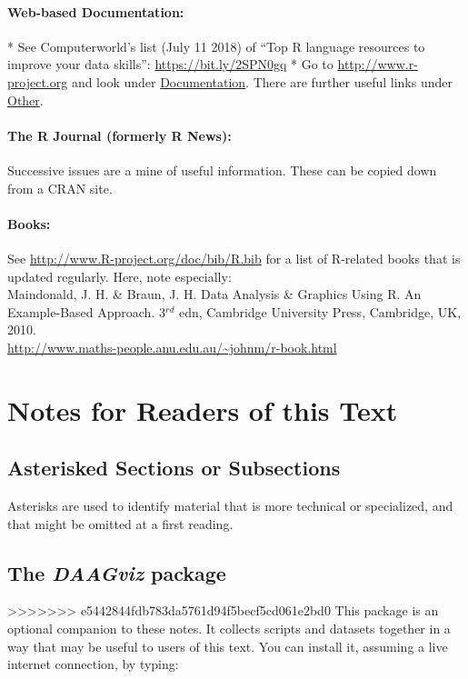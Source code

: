 \paragraph{Web-based Documentation:}

* See Computerworld's list (July 11 2018) of ``Top R language
resources to improve your data skills'':  
\url{https://bit.ly/2SPN0gq}
* Go to \url{http://www.r-project.org}
and look under \underline{Documentation}.
There are further useful links under \underline{Other}.

\paragraph{The R Journal (formerly R News):}
Successive issues are a mine of useful information.
These can be copied down from a CRAN site.

\paragraph{Books:}
See \url{http://www.R-project.org/doc/bib/R.bib} for a list of
R-related books that is updated regularly. Here, note
especially:\\[3pt]
\noindent
Maindonald, J. H. \& Braun, J. H. Data Analysis \&
  Graphics Using R. An Example-Based Approach. 3$^{rd}$ edn, Cambridge
  University Press,
  Cambridge, UK, 2010.\\
\noindent
\url{http://www.maths-people.anu.edu.au/~johnm/r-book.html}

\cleardoublepage
\section*{Notes for Readers of this Text}

\subsection*{Asterisked Sections or Subsections}

Asterisks are used to identify material that is more technical or
specialized, and that might be omitted at a first reading.

\subsection*{The {\em DAAGviz} package}

>>>>>>> e5442844fdb783da5761d94f5becf5cd061e2bd0
This package is an optional companion to these notes. 
It collects scripts and datasets together in a way that may be
useful to users of this text.  
You can install it, assuming a live internet connection,
by typing:

